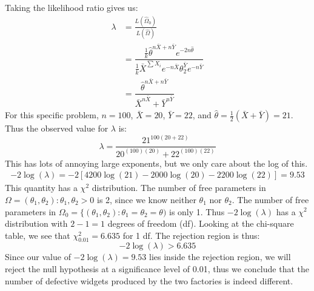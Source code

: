 \documentclass[notes.tex]{subfiles}
\begin{document}
Taking the likelihood ratio gives us:
\begin{align*}
\lambda &= \frac{ L(\hat{\Omega}_0) }{ L(\hat{\Omega}) } \\
&= \dfrac{ \frac{1}{k} \hat{\theta}^{n\bar{X} + n\bar{Y}} e^{-2 n \hat{\theta}} }{ \frac{1}{k} \bar{X}^{\sum X_i} e^{-n \bar{X}} \theta_2^{\bar{Y}} e^{-n \bar{Y}} } \\
&= \dfrac{ \hat{\theta}^{n\bar{X} + n\bar{Y}} }{ \bar{X}^{n \bar{X}} + \bar{Y}^{n \bar{Y}}}
\end{align*}
For this specific problem, $n = 100$, $\bar{X} = 20$, $\bar{Y} = 22$, and $\hat{\theta} = \frac{1}{2}(\bar{X} + \bar{Y}) =21$. Thus the observed value for $\lambda$ is:
\[
\lambda = \dfrac{ 21^{100(20 + 22)} }{ 20^{(100)(20)} + 22^{(100)(22)} }
\]
This has lots of annoying large exponents, but we only care about the log of this.
\begin{align*}
-2 \log(\lambda) = -2[4200 \log(21) - 2000 \log(20) - 2200 \log(22) ] = 9.53
\end{align*}
This quantity has a $\chi^2$ distribution. The number of free parameters in $\Omega = (\theta_1, \theta_2) : \theta_1, \theta_2 > 0$ is 2, since we know neither $\theta_1$ nor $\theta_2$. The number of free parameters in $\Omega_0 = \{(\theta_1, \theta_2) : \theta_1 = \theta_2 = \theta)$ is only 1. Thus $-2 \log(\lambda)$ has a $\chi^2$ distribution with $2 - 1 = 1$ degrees of freedom (df). Looking at the chi-square table, we see that $\chi^2_{0.01} = 6.635$ for 1 df. The rejection region is thus:
\[
-2 \log(\lambda) > 6.635
\]
Since our value of $-2 \log(\lambda) = 9.53$ lies inside the rejection region, we will reject the null hypothesis at a significance level of 0.01, thus we conclude that the number of defective widgets produced by the two factories is indeed different.
\end{document}
